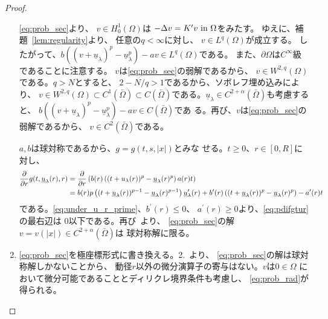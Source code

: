 \begin{proof}
\begin{enumerate}[1.]
        \ref{eq:prob_sec}より、
        $v \in H_0^1(\Omega)$は
        $- \Delta v = K^\prime v ~\text{in}~ \Omega$をみたす。
        ゆえに、補題~\ref{lem:regularity}より、
        任意の$q < \infty$に対し、
        $v \in L^q(\Omega)$が成立する。
        したがって、$b \left( (v+ \underline{u}_\lambda)^p -
        \underline{u}_\lambda^p \right) - av \in L^q(\Omega)$である。
        また、$\partial \Omega$は$C^\infty$級であることに注意する。
        $v$は\ref{eq:prob_sec}の弱解であるから、
        $v \in W^{2, q}(\Omega)$である。$q > N$とすると、
        $2 - N /q > 1$であるから、ソボレフ埋め込みにより、
        $v \in W^{2, q}(\Omega) \subset C^1(\bar{\Omega}) \subset
        C(\bar{\Omega})$である。$\underline{u}_\lambda \in C^{2 +
        \alpha}(\bar{\Omega})$も考慮すると、
        $b \left( (v+ \underline{u}_\lambda)^p -
        \underline{u}_\lambda^p \right) - av \in C(\bar{\Omega})$であ
        る。再び、$v$は\ref{eq:prob_sec}の弱解であるから、
        $v \in C^2(\bar{\Omega})$である。
        
        $a, b$は球対称であるから、$g = g(t, s, \lvert x \rvert)$とみな
        せる。$t \geq 0$、$r \in [0, R]$に対し、
        \begin{align}
         \frac{\partial }{\partial r} g(t, \underline{u}_\lambda(r), r)
         &= \frac{\partial }{\partial r} \left( b(r) \left( (t + u_\lambda(r))^p -
         \underline{u}_\lambda(r)^p \right) a(r) t \right) \notag \\
         &= b(r) p \left( (t+ \underline{u}_\lambda(r))^{p-1} -
         \underline{u}_\lambda(r)^{p-1} \right)
         \underline{u}_\lambda^\prime(r) + b^\prime(r) \left( (t +
         \underline{u}_\lambda(r))^p  - \underline{u}_\lambda(r)^p
         \right) - a^\prime(r) t \label{eq:pdifgtur}
        \end{align}
        である。\eqref{eq:under_u_r_prime}、$b^\prime(r) \leq 0$、
        $a^\prime(r) \geq 0$より、\eqref{eq:pdifgtur}の最右辺は
        $0$以下である。再び\cite{MR544879}~より、
        \ref{eq:prob_sec}の解
        $v = v(\lvert x \rvert) \in C^{2+\alpha}(\bar{\Omega})$は
        球対称解に限る。
  \item \ref{eq:prob_sec}を極座標形式に書き換える。2.~より、
        \ref{eq:prob_sec}の解は球対称解しかないことから、
        動径$r$以外の微分演算子の寄与はない。$v$は$0 \in \Omega$
        において微分可能であることとディリクレ境界条件も考慮し、
        \eqref{eq:prob_rad}が得られる。\qedhere
 \end{enumerate}
\end{proof}

